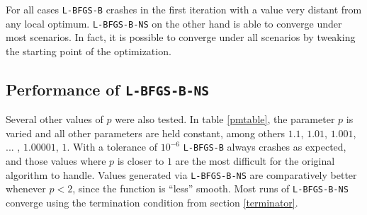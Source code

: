 For all cases \texttt{L-BFGS-B} crashes in the first iteration with a value very distant from any local optimum.  \texttt{L-BFGS-B-NS} on the other hand is able to converge under most scenarios. In fact, it is possible to converge under all scenarios by tweaking the starting point of the optimization.

\subsection{Performance of \texttt{L-BFGS-B-NS}}

Several other values of $p$ were also tested. In table \ref{pmtable}, the parameter $p$ is varied and all other parameters are held constant, among others $1.1$, $1.01$, $1.001$, ... , $1.00001$, $1$. With a tolerance of $10^{-6}$ \texttt{L-BFGS-B} always crashes as expected, and those values where $p$ is closer to $1$ are the most difficult for the original algorithm to handle.  Values generated via \texttt{L-BFGS-B-NS} are comparatively better whenever $p < 2$, since the function is ``less'' smooth. Most runs of \texttt{L-BFGS-B-NS} converge using the termination condition from section \ref{terminator}.

